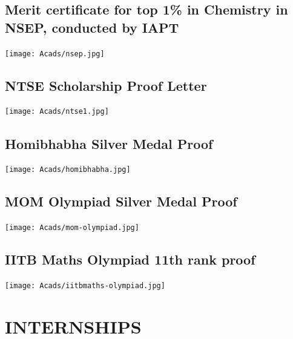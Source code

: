 \documentclass{article}
\begin{document}
	\subsection{Merit certificate for top 1\% in Chemistry in NSEP, conducted by IAPT}
	\begin{center}
\vspace{20pt}
		\texttt{[image: Acads/nsep.jpg]}{\centering}
	\end{center}
	\subsection{NTSE Scholarship Proof Letter}
	\begin{center}
\vspace{20pt}
		\texttt{[image: Acads/ntse1.jpg]}{\centering}
	\end{center}
	\subsection{Homibhabha Silver Medal Proof}
	\begin{center}
\vspace{20pt}
		\texttt{[image: Acads/homibhabha.jpg]}{\centering}
	\end{center}
	\subsection{MOM Olympiad Silver Medal Proof}
	\begin{center}
\vspace{20pt}
		\texttt{[image: Acads/mom-olympiad.jpg]}{\centering}
	\end{center}
	\subsection{IITB Maths Olympiad 11th rank proof}
	\begin{center}
\vspace{20pt}
		\texttt{[image: Acads/iitbmaths-olympiad.jpg]}{\centering}
	\end{center}

\newpage
\section{INTERNSHIPS}
\end{document}
